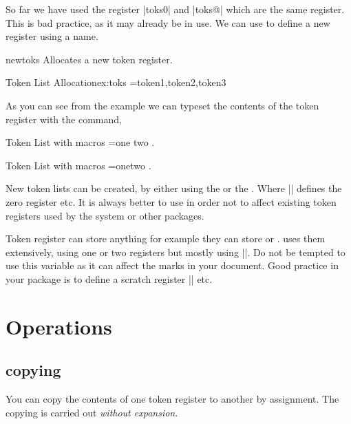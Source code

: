 So far we have used the register |toks0| and |toks@| which are the same register. This is bad practice, as it may already
be in use. We can use  to define a new register using a name.

\begin{docCommand}{newtoks}{}
Allocates a new token register.
\end{docCommand}


\begin{texexample}{Token List Allocation}{ex:toks}
\newtoks\alist 
\alist={token1,token2,token3}
\meaning\alist
\end{texexample}

As you can see from the example we can typeset the contents of the token register with the  command,

\begin{texexample}{Token List with macros}{}
\begingroup
\def\c{one}
\def\d{two}
\newtoks\blist 
\blist={{\c} {\d}}
\the\blist. 
\endgroup
\end{texexample}


\begin{texexample}{Token List with macros}{}
\begingroup
\def\c{one}
\def\d{two}
\newtoks\blist 
\blist={\c \d}
\the\blist. 
\endgroup
\end{texexample}

New token lists can be created, by either using the \cmd{\newtoks} or the \cmd{\toks}. Where || defines the zero register etc. It is always better to use \cmd{\newtoks} in order not to affect existing token registers used by the system or other packages.

Token register can store anything for example they can store \cmd{\vfil} or \cmd{\hfill}. \latexe uses them extensively, using one or two registers but mostly using |\@temptoken|. Do not be tempted to use this variable as it can affect the marks in your document. Good practice in your package is to define a scratch register |\mypackagetemptokena| etc.

\section{Operations}

\subsection{copying}

You can copy the contents of one token register to another by assignment. The copying is carried out \emph{without expansion}.

